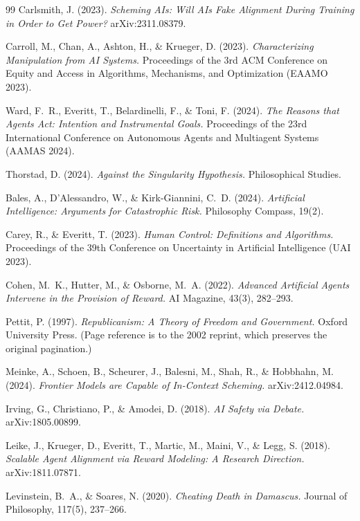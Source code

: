 \documentclass[11pt]{article}
\theoremstyle{definition}
\begin{document}
\begin{thebibliography}{99}
Carlsmith, J. (2023). \emph{Scheming AIs: Will AIs Fake Alignment During Training in Order to Get Power?} arXiv:2311.08379.

Carroll, M., Chan, A., Ashton, H., \& Krueger, D. (2023). \emph{Characterizing Manipulation from AI Systems.} Proceedings of the 3rd ACM Conference on Equity and Access in Algorithms, Mechanisms, and Optimization (EAAMO 2023).

Ward, F.~R., Everitt, T., Belardinelli, F., \& Toni, F. (2024). \emph{The Reasons that Agents Act: Intention and Instrumental Goals.} Proceedings of the 23rd International Conference on Autonomous Agents and Multiagent Systems (AAMAS 2024).

Thorstad, D. (2024). \emph{Against the Singularity Hypothesis.} Philosophical Studies.

Bales, A., D'Alessandro, W., \& Kirk-Giannini, C.~D. (2024). \emph{Artificial Intelligence: Arguments for Catastrophic Risk.} Philosophy Compass, 19(2).

Carey, R., \& Everitt, T. (2023). \emph{Human Control: Definitions and Algorithms.} Proceedings of the 39th Conference on Uncertainty in Artificial Intelligence (UAI 2023).

Cohen, M.~K., Hutter, M., \& Osborne, M.~A. (2022). \emph{Advanced Artificial Agents Intervene in the Provision of Reward.} AI Magazine, 43(3), 282--293.

Pettit, P. (1997). \emph{Republicanism: A Theory of Freedom and Government.} Oxford University Press. (Page reference is to the 2002 reprint, which preserves the original pagination.)

Meinke, A., Schoen, B., Scheurer, J., Balesni, M., Shah, R., \& Hobbhahn, M. (2024). \emph{Frontier Models are Capable of In-Context Scheming.} arXiv:2412.04984.

Irving, G., Christiano, P., \& Amodei, D. (2018). \emph{AI Safety via Debate.} arXiv:1805.00899.

Leike, J., Krueger, D., Everitt, T., Martic, M., Maini, V., \& Legg, S. (2018). \emph{Scalable Agent Alignment via Reward Modeling: A Research Direction.} arXiv:1811.07871.

Levinstein, B.~A., \& Soares, N. (2020). \emph{Cheating Death in Damascus.} Journal of Philosophy, 117(5), 237--266.


\end{thebibliography}
\end{document}
